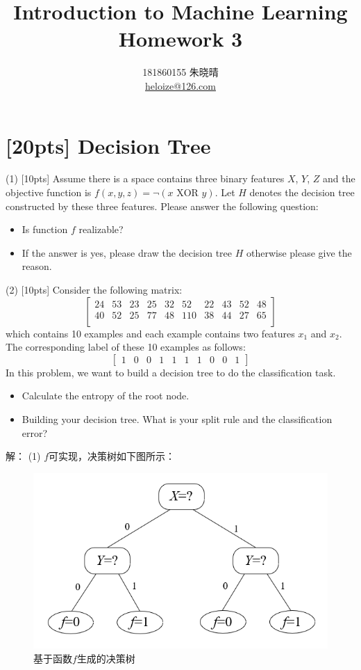 \documentclass[a4paper,utf8]{article}
\title{Introduction to Machine Learning\\Homework 3}
\author{181860155 朱晓晴\\\href{mailto:heloize@126.com}{heloize@126.com}}
\begin{document}
	\maketitle
	
	\section{[20pts] Decision Tree}

	\noindent (1) [10pts] Assume there is a space contains three binary features $X$, $Y$, $Z$ and the objective function is $f(x,y,z)=\neg(x \text{ XOR } y)$. Let $H$ denotes the decision tree constructed by these three features. Please answer the following question:
	\begin{itemize}
		\item Is function $f$ realizable? 
		\item If the answer is yes, please draw the decision tree $H$ otherwise please give the reason.\\
	\end{itemize}
	(2) [10pts] Consider the following matrix:
	$$
	\left[
	\begin{matrix}
	24 & 53 & 23 & 25 & 32 & 52 & 22 & 43 & 52 & 48 \\
	40 & 52 & 25 & 77 & 48 & 110 & 38 & 44 & 27 & 65\\
	\end{matrix}
	\right]
	$$
	which contains 10 examples and each example contains two features $x_1$ and $x_2$. The corresponding label of these 10 examples as follows:
	$$
	\left[
	\begin{matrix}
	1 & 0 & 0 &1 & 1 & 1 & 1& 0 & 0 & 1
	\end{matrix}
	\right]
	$$
	In this problem, we want to build a decision tree to do the classification task.
	\begin{itemize}
		\item Calculate the entropy of the root node.
		\item Building your decision tree. What is your split rule  and the classification error?\\
	\end{itemize}
	解：
	(1) $f$可实现，决策树如下图所示：
	\begin{figure}[H]
		\centering
		\includegraphics[scale=0.7]{p1-dt1.PNG}
		\caption{基于函数$f$生成的决策树}
	\end{figure}
\end{document}
